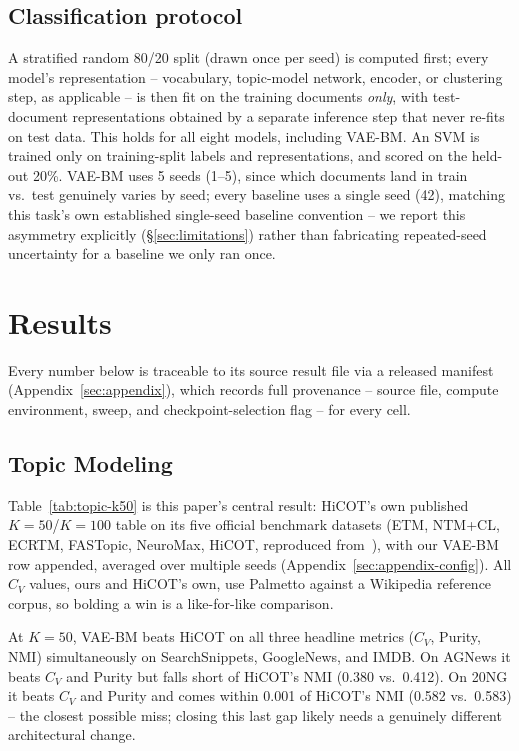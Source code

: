 \documentclass[11pt]{article}
\begin{document}
\subsection{Classification protocol}
A stratified random 80/20 split (drawn once per seed) is computed first; every model's representation -- vocabulary, topic-model network, encoder, or clustering step, as applicable -- is then fit on the training documents \emph{only}, with test-document representations obtained by a separate inference step that never re-fits on test data. This holds for all eight models, including VAE-BM. An SVM is trained only on training-split labels and representations, and scored on the held-out 20\%. VAE-BM uses 5 seeds (1--5), since which documents land in train vs.\ test genuinely varies by seed; every baseline uses a single seed (42), matching this task's own established single-seed baseline convention -- we report this asymmetry explicitly (\S\ref{sec:limitations}) rather than fabricating repeated-seed uncertainty for a baseline we only ran once.

\section{Results}
\label{sec:results}

Every number below is traceable to its source result file via a released manifest (Appendix~\ref{sec:appendix}), which records full provenance -- source file, compute environment, sweep, and checkpoint-selection flag -- for every cell.

\subsection{Topic Modeling}
\label{sec:topic-results}



Table~\ref{tab:topic-k50} is this paper's central result: HiCOT's own published $K{=}50$/$K{=}100$ table on its five official benchmark datasets (ETM, NTM+CL, ECRTM, FASTopic, NeuroMax, HiCOT, reproduced from~\citep{hicot2025}), with our VAE-BM row appended, averaged over multiple seeds (Appendix~\ref{sec:appendix-config}). All $C_V$ values, ours and HiCOT's own, use Palmetto against a Wikipedia reference corpus, so bolding a win is a like-for-like comparison.

At $K=50$, VAE-BM beats HiCOT on all three headline metrics ($C_V$, Purity, NMI) simultaneously on SearchSnippets, GoogleNews, and IMDB. On AGNews it beats $C_V$ and Purity but falls short of HiCOT's NMI (0.380 vs.\ 0.412). On 20NG it beats $C_V$ and Purity and comes within 0.001 of HiCOT's NMI (0.582 vs.\ 0.583) -- the closest possible miss; closing this last gap likely needs a genuinely different architectural change.
\end{document}
